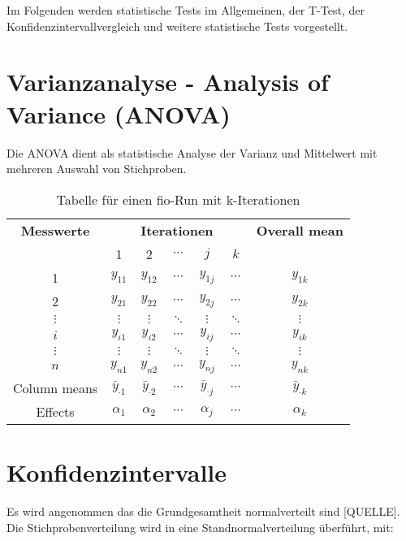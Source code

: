 Im Folgenden werden statistische Tests im
Allgemeinen, der T-Test, der Konfidenzintervallvergleich und weitere statistische Tests
vorgestellt.

\section{Varianzanalyse - Analysis of Variance (ANOVA)}

Die ANOVA dient als statistische Analyse der Varianz und Mittelwert mit mehreren Auswahl von Stichproben.




\begin{table}[h!]
  \centering
  \begin{tabular}{|c|*{5}{c}|c|}
  \hline
  \textbf{Messwerte} & \multicolumn{5}{c|}{\textbf{Iterationen}} & \textbf{Overall mean} \\
  \cline{2-6}
   & 1 & 2 & $\cdots$ & $j$ & $k$ & \\
  \hline
  1 & $y_{11}$ & $y_{12}$ & $\cdots$ & $y_{1j}$ & $\cdots$ & $y_{1k}$ \\
  2 & $y_{21}$ & $y_{22}$ & $\cdots$ & $y_{2j}$ & $\cdots$ & $y_{2k}$ \\
  $\vdots$ & $\vdots$ & $\vdots$ & $\ddots$ & $\vdots$ & $\ddots$ & $\vdots$ \\
  $i$ & $y_{i1}$ & $y_{i2}$ & $\cdots$ & $y_{ij}$ & $\cdots$ & $y_{ik}$ \\
  $\vdots$ & $\vdots$ & $\vdots$ & $\ddots$ & $\vdots$ & $\ddots$ & $\vdots$ \\
  $n$ & $y_{n1}$ & $y_{n2}$ & $\cdots$ & $y_{nj}$ & $\cdots$ & $y_{nk}$ \\
  \hline
  Column means & $\bar{y}_{\cdot1}$ & $\bar{y}_{\cdot2}$ & $\cdots$ & $\bar{y}_{\cdot j}$ & $\cdots$ & $\bar{y}_{\cdot k}$ \\
  Effects & $\alpha_1$ & $\alpha_2$ & $\cdots$ & $\alpha_j$ & $\cdots$ & $\alpha_k$ \\
  \hline
  \end{tabular}
  \caption{Tabelle für einen fio-Run mit k-Iterationen}
  \label{tab:measurements}
\end{table}

\section{Konfidenzintervalle}
Es wird angenommen das die Grundgesamtheit normalverteilt sind [QUELLE].
Die Stichprobenverteilung wird in eine Standnormalverteilung überführt, mit:

